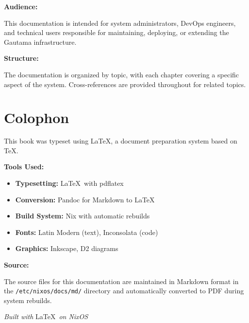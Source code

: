 \documentclass[11pt,a4paper,twoside,openright]{book}
\newcommand{\code}[1]{\texttt{#1}}
\begin{document}
\textbf{Audience:}

This documentation is intended for system administrators, DevOps engineers, and
technical users responsible for maintaining, deploying, or extending the Gautama
infrastructure.

\textbf{Structure:}

The documentation is organized by topic, with each chapter covering a specific
aspect of the system. Cross-references are provided throughout for related topics.

\mainmatter


\backmatter

\printindex

\chapter*{Colophon}

This book was typeset using \LaTeX, a document preparation system based on \TeX.

\textbf{Tools Used:}
\begin{itemize}
    \item \textbf{Typesetting:} \LaTeX\ with pdflatex
    \item \textbf{Conversion:} Pandoc for Markdown to \LaTeX
    \item \textbf{Build System:} Nix with automatic rebuilds
    \item \textbf{Fonts:} Latin Modern (text), Inconsolata (code)
    \item \textbf{Graphics:} Inkscape, D2 diagrams
\end{itemize}

\textbf{Source:}

The source files for this documentation are maintained in Markdown format in the
\code{/etc/nixos/docs/md/} directory and automatically converted to PDF during
system rebuilds.

\vspace{1cm}

\textit{Built with} \LaTeX\ \textit{on NixOS}
\end{document}
